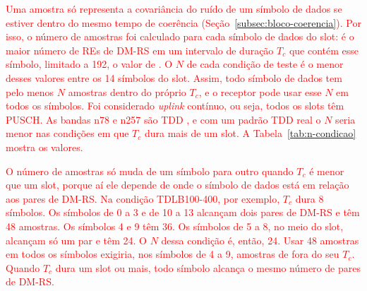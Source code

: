 \textcolor{red}{Uma amostra só representa a covariância do ruído de um símbolo de dados se estiver dentro do mesmo tempo de coerência (Seção~\ref{subsec:bloco-coerencia}). Por isso, o número de amostras foi calculado para cada símbolo de dados do slot: é o maior número de REs de DM-RS em um intervalo de duração $T_c$ que contém esse símbolo, limitado a 192, o valor de . O $N$ de cada condição de teste é o menor desses valores entre os 14 símbolos do slot. Assim, todo símbolo de dados tem pelo menos $N$ amostras dentro do próprio $T_c$, e o receptor pode usar esse $N$ em todos os símbolos. Foi considerado \textit{uplink} contínuo, ou seja, todos os slots têm PUSCH. As bandas n78 e n257 são TDD \cite[Tabs.~5.2-1 e 5.2-2]{3gpp-ts38104}, e com um padrão TDD real o $N$ seria menor nas condições em que $T_c$ dura mais de um slot. A Tabela~\ref{tab:n-condicao} mostra os valores.}

\textcolor{red}{O número de amostras só muda de um símbolo para outro quando $T_c$ é menor que um slot, porque aí ele depende de onde o símbolo de dados está em relação aos pares de DM-RS. Na condição TDLB100-400, por exemplo, $T_c$ dura 8 símbolos. Os símbolos de 0 a 3 e de 10 a 13 alcançam dois pares de DM-RS e têm 48 amostras. Os símbolos 4 e 9 têm 36. Os símbolos de 5 a 8, no meio do slot, alcançam só um par e têm 24. O $N$ dessa condição é, então, 24. Usar 48 amostras em todos os símbolos exigiria, nos símbolos de 4 a 9, amostras de fora do seu $T_c$. Quando $T_c$ dura um slot ou mais, todo símbolo alcança o mesmo número de pares de DM-RS.}


